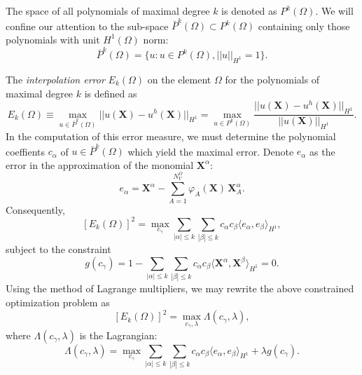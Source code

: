 The space of all polynomials of maximal degree $k$ is denoted as $P^k (\Omega)$. We will confine our attention to the sub-space $\bar{P}^k (\Omega) \subset P^k (\Omega)$ containing only those polynomials with unit $H^1 (\Omega)$ norm:
\begin{equation}
        \bar{P}^k (\Omega) = \{ u : u \in P^k (\Omega), ||u||_{H^1} = 1 \}.
\end{equation}

The \textit{interpolation error} $E_k (\Omega)$ on the element $\Omega$ for the polynomials of maximal degree $k$ is defined as
\begin{equation}
        E_k (\Omega) \equiv \max_{u \in \bar{P}^k (\Omega)} || u(\mathbf{X}) - u^h(\mathbf{X}) ||_{H^1} = \max_{u \in P^k (\Omega)} \frac{|| u(\mathbf{X}) - u^h(\mathbf{X}) ||_{H^1}}{|| u(\mathbf{X}) ||_{H^1}}.
\end{equation}
In the computation of this error measure, we must determine the polynomial coeffients $c_\alpha$ of $u \in \bar{P}^k (\Omega)$ which yield the maximal error. Denote $e_\alpha$ as the error in the approximation of the monomial $\mathbf{X}^\alpha$:
\begin{equation}
        e_\alpha = \mathbf{X}^{\alpha} - \sum_{A = 1}^{N^{\Omega}_V} \varphi_A (\mathbf{X}) \, \mathbf{X}_A^{\alpha}.
\end{equation}
Consequently,
\begin{equation}
        \left[ E_k (\Omega) \right]^2 = \max_{c_\gamma} \sum_{|\alpha| \leq k} \sum_{|\beta| \leq k} c_{\alpha} c_{\beta} \langle e_\alpha, e_\beta \rangle_{H^1},
\end{equation}
subject to the constraint
\begin{equation}
        g(c_\gamma) = 1 - \sum_{|\alpha| \leq k} \sum_{|\beta| \leq k} c_{\alpha} c_{\beta} \langle \mathbf{X}^\alpha, \mathbf{X}^\beta \rangle_{H^1} = 0.
\end{equation}
Using the method of Lagrange multipliers, we may rewrite the above constrained optimization problem as
\begin{equation}
        \left[ E_k (\Omega) \right]^2 = \max_{c_\gamma, \lambda} \Lambda (c_\gamma,\lambda),
\end{equation}
where $\Lambda (c_\gamma,\lambda)$ is the Lagrangian:
\begin{equation}
        \Lambda (c_\gamma, \lambda) = \max_{c_\gamma} \sum_{|\alpha| \leq  k} \sum_{|\beta| \leq k} c_{\alpha} c_{\beta} \langle e_\alpha, e_\beta \rangle_{H^1} + \lambda g(c_\gamma).
\end{equation}
